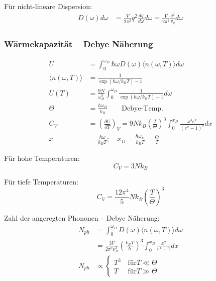 Für nicht-lineare Dispersion:
\begin{equation*}
    \begin{aligned}
        D(\omega)d \omega &= \frac{V}{2 \pi^2} q^2 \frac{dq}{d\omega} d\omega = \frac{V}{2 \pi^2} \frac{q^2}{v_g} d\omega
    \end{aligned}
\end{equation*}

\subsubsection*{Wärmekapazität – Debye Näherung}
\begin{equation*}
    \begin{aligned}
        U &= \int_0^{\omega_D} \hbar \omega D(\omega) \langle n(\omega, T) \rangle d\omega \\
        \langle n(\omega,T) \rangle &= \frac{1}{\exp(\hbar \omega / k_B T) -1} \\
        U(T) &= \frac{9N}{\omega_D^3} \int_0^{\omega_D} \frac{1}{\exp(\hbar \omega / k_B T) -1} d\omega \\
        \Theta &= \frac{\hbar \omega_D}{k_B} \qquad \text{Debye-Temp.} \\
        C_V &= \left(\frac{\partial U}{\partial T}\right)_V = 9Nk_B \left(\frac{T}{\Theta}\right)^3 \int_0^{x_D} \frac{x^4 e^x}{(e^x -1)^2} dx \\
        x &= \frac{\hbar \omega}{k_B T}; \quad x_D = \frac{\hbar \omega_D}{k_B T} = \frac{\Theta}{T}
    \end{aligned}
\end{equation*}

Für hohe Temperaturen: 
\begin{equation*}
    C_V = 3N k_B
\end{equation*}

Für tiefe Temperaturen:
\begin{equation*}
    C_V = \frac{12 \pi^4}{5} N k_B \left(\frac{T}{\Theta}\right)^3
\end{equation*}

Zahl der angeregten Phononen – Debye Näherung:
\begin{equation*}
    \begin{aligned}
        N_{ph} &= \int_0^{\omega_D} D(\omega) \langle n (\omega,T) \rangle d\omega \\ 
        &= \frac{3V}{2 \pi^2 \nu_D^3} \left(\frac{k_B T}{\hbar}\right)^3 \int_0^{x_D} \frac{x^2}{e^x -1}dx \\
        N_{ph} &\propto \begin{cases}
            T^3 & \, \text{für} T \ll \Theta \\
            T &  \, \text{für} T \gg \Theta
            \end{cases} \\
    \end{aligned}
\end{equation*}

